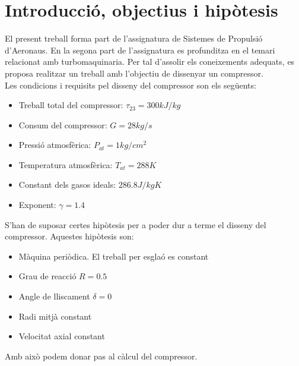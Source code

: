 \section{Introducció, objectius i hipòtesis}
\label{Intro}
El present treball forma part de l'assignatura de Sistemes de Propulsió d'Aeronaus. En la segona part de l'assignatura es profunditza en el temari relacionat amb turbomaquinaria. Per tal d'assolir els coneixements adequats, es proposa realitzar un treball amb l'objectiu de dissenyar un compressor.\\
Les condicions i requisits pel disseny del compressor son els següents:
\begin{itemize}
\item Treball total del compressor: $\tau_{23}=300 kJ/kg$
\item Consum del compressor: $G=28 kg/s$
\item Pressió atmosfèrica: $P_{at}=1kg/cm^2$
\item Temperatura atmosfèrica: $T_{at}=288K$
\item Constant dels gasos ideals: $286.8 J/kgK$
\item Exponent: $\gamma =1.4 $
\end{itemize}
S'han de suposar certes hipòtesis per a poder dur a terme el disseny del compressor. Aquestes hipòtesis son: 
\begin{itemize}
\item Màquina periòdica. El treball per esglaó es constant
\item Grau de reacció $R=0.5$
\item Angle de lliscament $\delta = 0$
\item Radi mitjà constant
\item Velocitat axial constant 
\end{itemize}
Amb això podem donar pas al càlcul del compressor. 